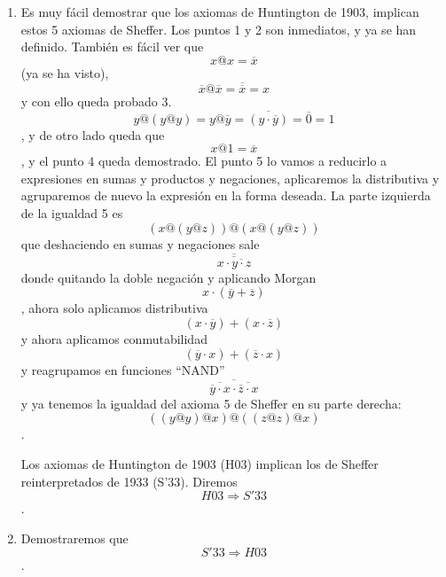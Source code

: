 \documentclass[
]{article}
\providecommand{\tightlist}{%
  \setlength{\itemsep}{0pt}\setlength{\parskip}{0pt}}
\begin{document}
\begin{enumerate}
\begin{enumerate}
\begin{enumerate}
\begin{enumerate}
        \begin{enumerate}
        \def\labelenumv{\arabic{enumv}.}
        \tightlist
        \item
          \[{\#\left( B \right)} \geq 2\]
        \item
          \[{{\cdot @} \cdot}:{{B \times B}\rightarrow B}\forall x,{y \in B}\exists!{z \in B}x@{y = z}\]
        \item
          \[\forall{x \in B}{({x@x})}@{{({x@x})} = x}\]
        \item
          \[\forall x,{y \in B}x@{{({y@{({y@y})}})} = x}@x\]
        \item
          \[\forall x,y,{z \in B}{({x@{({y@z})}})}@{{({x@{({y@z})}})} = {({{({y@y})}@x})}}@{({{({z@z})}@x})}\]
        \end{enumerate}
      \item
        Es muy fácil demostrar que los axiomas de Huntington de 1903,
        implican estos 5 axiomas de Sheffer. Los puntos 1 y 2 son
        inmediatos, y ya se han definido. También es fácil ver que
        \[x@{x = \overline{x}}\] (ya se ha visto),
        \[\overline{x}@{{\overline{x} = \overline{\overline{x}}} = x}\]y
        con ello queda probado
        3.\[y@{{({y@y})} = y}@{{{\overline{y} = \overline{({y\cdot\overline{y}})}} = \overline{0}} = 1}\],
        y de otro lado queda que \[x@{1 = \overline{x}}\], y el punto 4
        queda demostrado. El punto 5 lo vamos a reducirlo a expresiones
        en sumas y productos y negaciones, aplicaremos la distributiva y
        agruparemos de nuevo la expresión en la forma deseada. La parte
        izquierda de la igualdad 5 es
        \[{({x@{({y@z})}})}@{({x@{({y@z})}})}\]que deshaciendo en sumas
        y negaciones
        sale\[\overline{\overline{x\cdot\overline{y\cdot z}}}\]donde
        quitando la doble negación y aplicando
        Morgan\[x \cdot {({\overline{y} + \overline{z}})}\], ahora solo
        aplicamos
        distributiva\[{({x \cdot \overline{y}})} + {({x \cdot \overline{z}})}\]
        y ahora aplicamos
        conmutabilidad\[{({\overline{y} \cdot x})} + {({\overline{z} \cdot x})}\]y
        reagrupamos en funciones
        ``NAND''\[\overline{\overline{\overline{y}\cdot x}\cdot\overline{\overline{z}\cdot x}}\]y
        ya tenemos la igualdad del axioma 5 de Sheffer en su parte
        derecha:\[{({{({y@y})}@x})}@{({{({z@z})}@x})}\].

        Los axiomas de Huntington de 1903 (H03) implican los de Sheffer
        reinterpretados de 1933 (S'33). Diremos
        \[\mathit{H03}\Rightarrow S'33\].
      \item
        Demostraremos que \[S'33\Rightarrow\mathit{H03}\].


\end{enumerate}
\end{enumerate}
\end{enumerate}
\end{enumerate}
\end{document}
